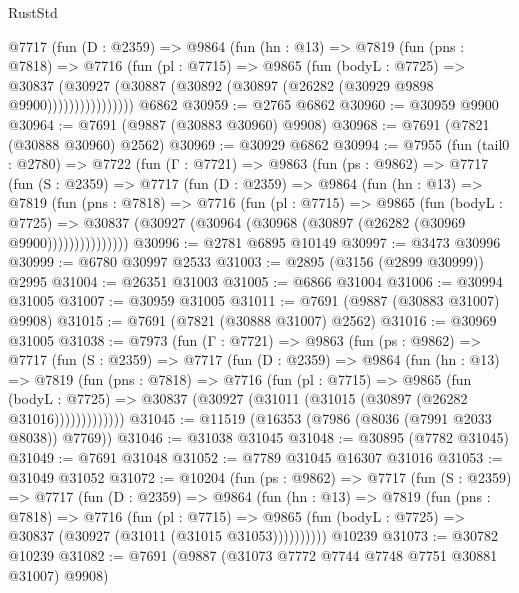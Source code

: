 \begin{lexlean}{RustStd}
\begin{coremodule}
            @7717
              (fun (D : @2359) =>
              @9864
                (fun (hn : @13) =>
                @7819
                  (fun (pns : @7818) =>
                  @7716
                    (fun (pl : @7715) =>
                    @9865
                      (fun (bodyL : @7725) =>
                      @30837
                        (@30927 (@30887 (@30892 (@30897 (@26282 (@30929 @9898 @9900))))))))))))))))
    @6862
@30959 := @2765 @6862
@30960 := @30959 @9900
@30964 := @7691 (@9887 (@30883 @30960) @9908)
@30968 := @7691 (@7821 (@30888 @30960) @2562)
@30969 := @30929 @6862
@30994 := @7955
    (fun (tail0 : @2780) =>
    @7722
      (fun (Γ : @7721) =>
      @9863
        (fun (ps : @9862) =>
        @7717
          (fun (S : @2359) =>
          @7717
            (fun (D : @2359) =>
            @9864
              (fun (hn : @13) =>
              @7819
                (fun (pns : @7818) =>
                @7716
                  (fun (pl : @7715) =>
                  @9865
                    (fun (bodyL : @7725) =>
                    @30837 (@30927 (@30964 (@30968 (@30897 (@26282 (@30969 @9900)))))))))))))))
@30996 := @2781 @6895 @10149
@30997 := @3473 @30996
@30999 := @6780 @30997 @2533
@31003 := @2895 (@3156 (@2899 @30999)) @2995
@31004 := @26351 @31003
@31005 := @6866 @31004
@31006 := @30994 @31005
@31007 := @30959 @31005
@31011 := @7691 (@9887 (@30883 @31007) @9908)
@31015 := @7691 (@7821 (@30888 @31007) @2562)
@31016 := @30969 @31005
@31038 := @7973
    (fun (Γ : @7721) =>
    @9863
      (fun (ps : @9862) =>
      @7717
        (fun (S : @2359) =>
        @7717
          (fun (D : @2359) =>
          @9864
            (fun (hn : @13) =>
            @7819
              (fun (pns : @7818) =>
              @7716
                (fun (pl : @7715) =>
                @9865
                  (fun (bodyL : @7725) =>
                  @30837 (@30927 (@31011 (@31015 (@30897 (@26282 @31016)))))))))))))
@31045 := @11519 (@16353 (@7986 (@8036 (@7991 @2033 @8038)) @7769))
@31046 := @31038 @31045
@31048 := @30895 (@7782 @31045)
@31049 := @7691 @31048
@31052 := @7789 @31045 @16307 @31016
@31053 := @31049 @31052
@31072 := @10204
    (fun (ps : @9862) =>
    @7717
      (fun (S : @2359) =>
      @7717
        (fun (D : @2359) =>
        @9864
          (fun (hn : @13) =>
          @7819
            (fun (pns : @7818) =>
            @7716
              (fun (pl : @7715) =>
              @9865 (fun (bodyL : @7725) => @30837 (@30927 (@31011 (@31015 @31053))))))))))
    @10239
@31073 := @30782 @10239
@31082 := @7691 (@9887 (@31073 @7772 @7744 @7748 @7751 @30881 @31007) @9908)

\end{coremodule}
\end{lexlean}
